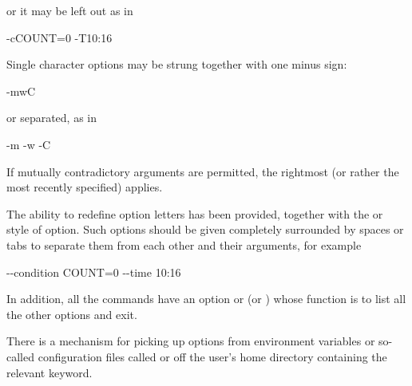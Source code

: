 or it may be left out as in

\begin{expara}

\BtrName{} -cCOUNT=0 -T10:16

\end{expara}

Single character options may be strung together with one minus sign:

\begin{expara}

\BtrName{} -mwC

\end{expara}

or separated, as in

\begin{expara}

\BtrName{} -m -w -C

\end{expara}

If mutually contradictory arguments are permitted, the rightmost (or rather the most recently specified) applies.

The ability to redefine option letters has been provided, together with the  or
 style of option. Such options should be given completely surrounded by spaces or tabs to separate
them from each other and their arguments, for example

\begin{expara}

\BtrName{} -{}-condition COUNT=0 -{}-time 10:16

\end{expara}

In addition, all the commands have an option  or  (or ) whose function is to list all the other options and exit.

There is a mechanism for picking up options from environment variables or so-called configuration files called \configurationfile{}
or \homeconfigpath{} off the user's home directory containing the relevant keyword.

